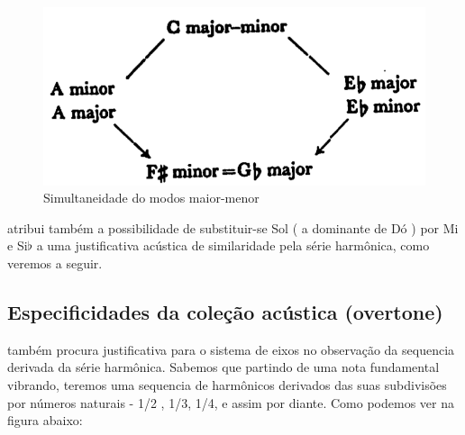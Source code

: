 \documentclass[
	12pt,				%
	openright,			%
	twoside,			%
	a4paper,			%
	english,			%
	french,				%
	spanish,			%
	brazil				%
	]{abntex2}
\begin{document}
\begin{figure}[!h]
	\caption{\label{fig_grafico}Simultaneidade do modos maior-menor }
	\begin{center}
	    \includegraphics[scale=0.3]{axis/maiormenor.png}
	\end{center}
\end{figure}

 atribui também a possibilidade de substituir-se Sol ( a dominante de Dó ) por Mi e Si$\flat$ a uma justificativa acústica de similaridade pela série harmônica, como veremos a seguir. 



\subsection{Especificidades da coleção acústica (overtone)}

 também procura  justificativa para o sistema de eixos no observação da sequencia derivada da série harmônica. Sabemos que partindo de uma nota fundamental vibrando, teremos uma sequencia de harmônicos derivados das suas subdivisões por números naturais - 1/2 , 1/3, 1/4, e assim por diante. Como podemos ver na figura abaixo:
\end{document}
